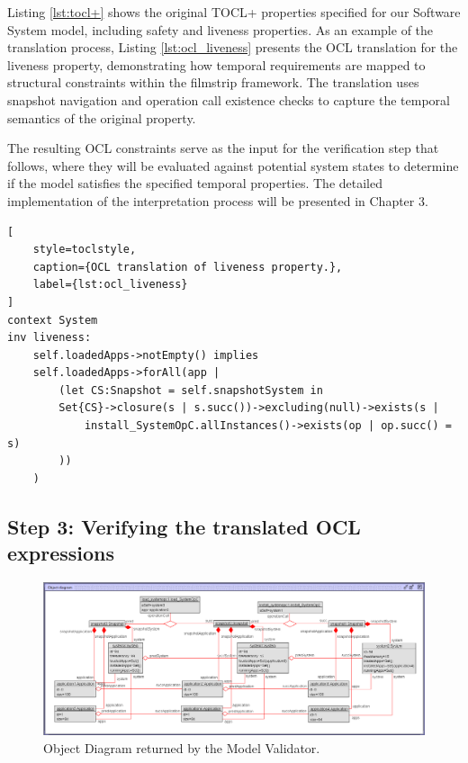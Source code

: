 Listing \ref{lst:tocl+} shows the original TOCL+ properties specified for our 
Software System model, including safety and liveness properties. As an example of 
the translation process, Listing \ref{lst:ocl_liveness} presents the OCL translation 
for the liveness property, demonstrating how temporal requirements are mapped to 
structural constraints within the filmstrip framework. The translation uses snapshot 
navigation and operation call existence checks to capture the temporal semantics of 
the original property.

The resulting OCL constraints serve as the input for the verification step that 
follows, where they will be evaluated against potential system states to determine 
if the model satisfies the specified temporal properties. The detailed implementation 
of the interpretation process will be presented in Chapter 3.

\begin{lstlisting}[
    style=toclstyle, 
    caption={OCL translation of liveness property.}, 
    label={lst:ocl_liveness}
]
context System
inv liveness:
    self.loadedApps->notEmpty() implies
    self.loadedApps->forAll(app |
        (let CS:Snapshot = self.snapshotSystem in 
        Set{CS}->closure(s | s.succ())->excluding(null)->exists(s | 
            install_SystemOpC.allInstances()->exists(op | op.succ() = s)
        ))
    )
\end{lstlisting}


\subsection{Step 3: Verifying the translated OCL expressions}

\begin{figure}
    \centering
    \includegraphics[width=1\textwidth]{figures/c2/ObjectDiagram_Liveness_LoadInstall.png}
    \caption{Object Diagram returned by the Model Validator.}
    \label{fig:object_diagram_liveness}
\end{figure}

